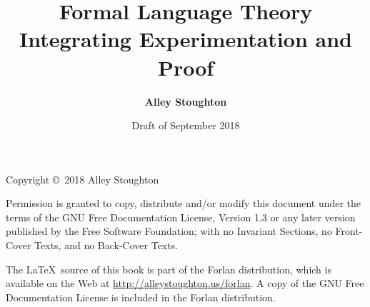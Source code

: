 \documentclass[11pt,twoside]{book}
\begin{document}

\title{\Huge\bf Formal Language Theory\\[.3cm]
\LARGE\bf Integrating Experimentation and Proof}

\author{\LARGE\bf Alley Stoughton}

\date{Draft of September 2018}

\titlepic{}

\maketitle

\thispagestyle{empty}

\noindent Copyright \copyright\ 2018 Alley Stoughton

\vspace{.5cm}
\noindent
Permission is granted to copy, distribute and/or modify this document
under the terms of the GNU Free Documentation License, Version 1.3 or
any later version published by the Free Software Foundation; with no
Invariant Sections, no Front-Cover Texts, and no Back-Cover Texts.

The \LaTeX\ source of this book is part of the Forlan distribution,
which is available on the Web at \url{http://alleystoughton.us/forlan}.  A
copy of the GNU Free Documentation License is included in the
Forlan distribution.

\clearemptydoublepage

\tableofcontents

\clearemptydoublepage

\listoffigures

\clearemptydoublepage







\clearemptydoublepage







\clearemptydoublepage

{\small
\printindex}
\end{document}
